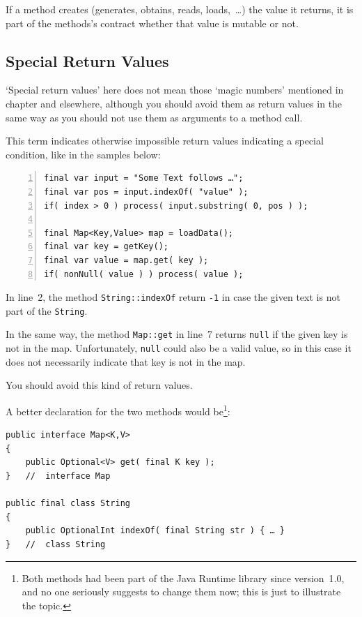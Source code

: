 If a method creates (generates, obtains, reads, loads,~…) the value it returns, it is part of the methods's contract whether that value is mutable or not.


\subsection{Special Return Values}\label{sec:SpecialReturnValues}
‘Special return values’ here does not mean those ‘magic numbers’ mentioned in chapter  and elsewhere, although you should avoid them as return values in the same way as you should not use them as arguments to a method call.

This term indicates otherwise impossible return values indicating a special condition, like in the samples below:
\begin{lstlisting}[numbers=left]
final var input = "Some Text follows …";
final var pos = input.indexOf( "value" );
if( index > 0 ) process( input.substring( 0, pos ) );

final Map<Key,Value> map = loadData();
final var key = getKey();
final var value = map.get( key );
if( nonNull( value ) ) process( value );
\end{lstlisting}
In line~2, the method \lstinline|String::indexOf|\autocite{ORACLE_DOC_STRING:indexOf} return \verb#-1# in case the given text is not part of the \lstinline|String|.

In the same way, the method \lstinline|Map::get|\autocite{ORACLE_DOC_MAP:get} in line~7 returns \lstinline|null| if the given key is not in the map. Unfortunately, \lstinline|null| could also be a valid value, so in this case it does not necessarily indicate that key is not in the map.

You should avoid this kind of return values.

A better declaration for the two methods would be\footnote{Both methods had been part of the Java Runtime library since version~1.0, and no one seriously suggests to change them now; this is just to illustrate the topic.}:
\begin{lstlisting}
public interface Map<K,V>
{
    public Optional<V> get( final K key );
}   //  interface Map

public final class String
{
    public OptionalInt indexOf( final String str ) { … }
}   //  class String
\end{lstlisting}

